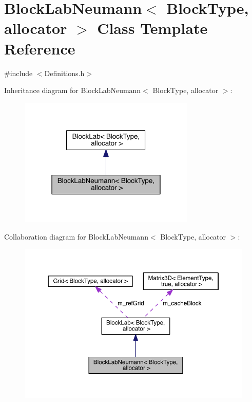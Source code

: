 \hypertarget{class_block_lab_neumann}{}\section{Block\+Lab\+Neumann$<$ Block\+Type, allocator $>$ Class Template Reference}
\label{class_block_lab_neumann}


{\ttfamily \#include $<$Definitions.\+h$>$}



Inheritance diagram for Block\+Lab\+Neumann$<$ Block\+Type, allocator $>$\+:\nopagebreak
\begin{figure}[H]
\begin{center}
\leavevmode
\includegraphics[width=238pt]{d0/d2e/class_block_lab_neumann__inherit__graph}
\end{center}
\end{figure}


Collaboration diagram for Block\+Lab\+Neumann$<$ Block\+Type, allocator $>$\+:\nopagebreak
\begin{figure}[H]
\begin{center}
\leavevmode
\includegraphics[width=350pt]{d4/df9/class_block_lab_neumann__coll__graph}
\end{center}
\end{figure}
